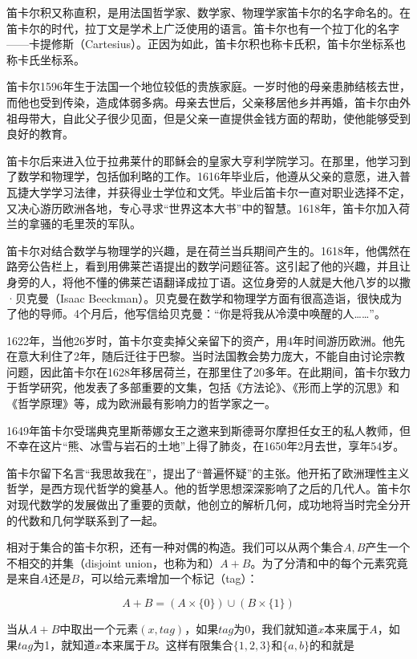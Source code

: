 \documentclass{article}
\begin{document}
 
笛卡尔积又称直积，是用法国哲学家、数学家、物理学家笛卡尔的名字命名的。在笛卡尔的时代，拉丁文是学术上广泛使用的语言。笛卡尔也有一个拉丁化的名字——卡提修斯（Cartesius）。正因为如此，笛卡尔积也称卡氏积，笛卡尔坐标系也称卡氏坐标系。

笛卡尔1596年生于法国一个地位较低的贵族家庭。一岁时他的母亲患肺结核去世，而他也受到传染，造成体弱多病。母亲去世后，父亲移居他乡并再婚，笛卡尔由外祖母带大，自此父子很少见面，但是父亲一直提供金钱方面的帮助，使他能够受到良好的教育。

笛卡尔后来进入位于拉弗莱什的耶稣会的皇家大亨利学院学习。在那里，他学习到了数学和物理学，包括伽利略的工作。1616年毕业后，他遵从父亲的意愿，进入普瓦捷大学学习法律，并获得业士学位和文凭。毕业后笛卡尔一直对职业选择不定，又决心游历欧洲各地，专心寻求“世界这本大书”中的智慧。1618年，笛卡尔加入荷兰的拿骚的毛里茨的军队。

笛卡尔对结合数学与物理学的兴趣，是在荷兰当兵期间产生的。1618年，他偶然在路旁公告栏上，看到用佛莱芒语提出的数学问题征答。这引起了他的兴趣，并且让身旁的人，将他不懂的佛莱芒语翻译成拉丁语。这位身旁的人就是大他八岁的以撒·贝克曼（Isaac Beeckman）。贝克曼在数学和物理学方面有很高造诣，很快成为了他的导师。4个月后，他写信给贝克曼：“你是将我从冷漠中唤醒的人……”。

1622年，当他26岁时，笛卡尔变卖掉父亲留下的资产，用4年时间游历欧洲。他先在意大利住了2年，随后迁往于巴黎。当时法国教会势力庞大，不能自由讨论宗教问题，因此笛卡尔在1628年移居荷兰，在那里住了20多年。在此期间，笛卡尔致力于哲学研究，他发表了多部重要的文集，包括《方法论》、《形而上学的沉思》和《哲学原理》等，成为欧洲最有影响力的哲学家之一。

1649年笛卡尔受瑞典克里斯蒂娜女王之邀来到斯德哥尔摩担任女王的私人教师，但不幸在这片“熊、冰雪与岩石的土地”上得了肺炎，在1650年2月去世，享年54岁。

笛卡尔留下名言“我思故我在”，提出了“普遍怀疑”的主张。他开拓了欧洲理性主义哲学，是西方现代哲学的奠基人。他的哲学思想深深影响了之后的几代人。笛卡尔对现代数学的发展做出了重要的贡献，他创立的解析几何，成功地将当时完全分开的代数和几何学联系到了一起。

\vspace{5mm}

相对于集合的笛卡尔积，还有一种对偶的构造。我们可以从两个集合$A, B$产生一个不相交的并集（disjoint union，也称为和）$A + B$。为了分清和中的每个元素究竟是来自$A$还是$B$，可以给元素增加一个标记（tag）：

\[
A + B = (A \times \{0\}) \cup (B \times \{1\})
\]

当从$A+B$中取出一个元素$(x, tag)$，如果$tag$为0，我们就知道$x$本来属于$A$，如果$tag$为1，就知道$x$本来属于$B$。这样有限集合$\{1, 2, 3\}$和$\{a, b\}$的和就是
\end{document}
